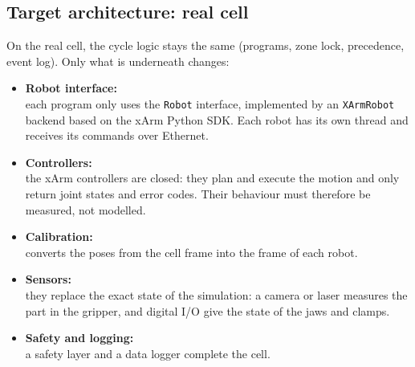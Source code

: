 \documentclass[11pt,a4paper]{article}
\newcommand{\code}[1]{\texttt{#1}}
\begin{document}
\subsection{Target architecture: real cell}

On the real cell, the cycle logic stays the same (programs, zone lock, precedence, event log). Only
what is underneath changes:
\begin{itemize}
  \item \textbf{Robot interface:}\\ each program only uses the \code{Robot} interface, implemented
        by an \code{XArmRobot} backend based on the xArm Python SDK. Each robot has its own thread
        and receives its commands over Ethernet.
  \item \textbf{Controllers:}\\ the xArm controllers are closed: they plan and execute the motion
        and only return joint states and error codes. Their behaviour must therefore be measured,
        not modelled.
  \item \textbf{Calibration:}\\ converts the poses from the cell frame into the frame of each robot.
  \item \textbf{Sensors:}\\ they replace the exact state of the simulation: a camera or laser
        measures the part in the gripper, and digital I/O give the state of the jaws and clamps.
  \item \textbf{Safety and logging:}\\ a safety layer and a data logger complete the cell.
\end{itemize}
\end{document}
